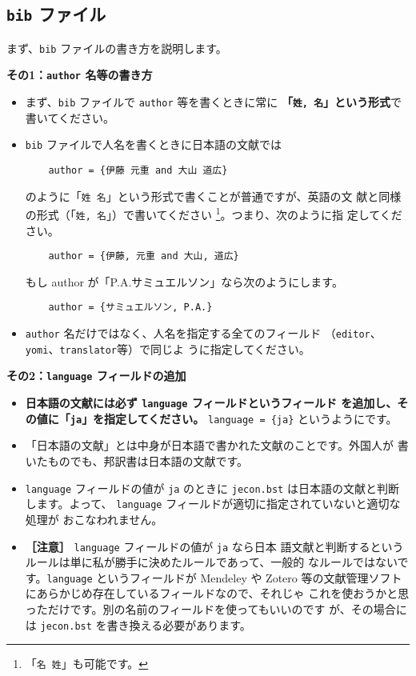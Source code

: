 \documentclass[a4paper,10pt]{bxjsarticle}
\begin{document}
\subsection{\texttt{bib} ファイル}

まず、\texttt{bib} ファイルの書き方を説明します。
\vspace*{1em}

\textbf{その1：\texttt{author} 名等の書き方}
\begin{itemize}
 \item まず、\texttt{bib} ファイルで \texttt{author} 等を書くときに常に
       \textbf{「\texttt{姓,\ 名}」という形式}で書いてください。
 \item \texttt{bib} ファイルで人名を書くときに日本語の文献では
\begin{verbatim}
    author = {伊藤 元重 and 大山 道広}
\end{verbatim}
       のように「\verb|姓 名|」という形式で書くことが普通ですが、英語の文
       献と同様の形式（「\verb|姓, 名|」）で書いてください
       \footnote{「\texttt{名\ 姓}」も可能です。}。つまり、次のように指
       定してください。
\begin{verbatim}
    author = {伊藤, 元重 and 大山, 道広}
\end{verbatim}
       もし author が「P.A.サミュエルソン」なら次のようにします。
\begin{verbatim}
    author = {サミュエルソン, P.A.}
\end{verbatim}
 \item \texttt{author} 名だけではなく、人名を指定する全てのフィールド
       （\texttt{editor}、\texttt{yomi}、\texttt{translator}等）で同じよ
       うに指定してください。
\end{itemize}

\vspace*{1em}

\textbf{その2：\texttt{language} フィールドの追加}
\begin{itemize}
 \item \textbf{日本語の文献には必ず \texttt{language} フィールドというフィールド
       を追加し、その値に「\texttt{ja}」を指定してください。}
       \verb|language = {ja}| というようにです。
 \item 「日本語の文献」とは中身が日本語で書かれた文献のことです。外国人が
       書いたものでも、邦訳書は日本語の文献です。
 \item \texttt{language} フィールドの値が \texttt{ja} のときに
       \texttt{jecon.bst} は日本語の文献と判断します。よって、
       \texttt{language} フィールドが適切に指定されていないと適切な処理が
       おこなわれません。
 \item \textbf{［注意］} \texttt{language} フィールドの値が \texttt{ja} なら日本
       語文献と判断するというルールは単に私が勝手に決めたルールであって、一般的
       なルールではないです。\texttt{language} というフィールドが Mendeley や
       Zotero 等の文献管理ソフトにあらかじめ存在しているフィールドなので、それじゃ
       これを使おうかと思っただけです。別の名前のフィールドを使ってもいいのです
       が、その場合には \texttt{jecon.bst} を書き換える必要があります。
\end{itemize}
\end{document}
